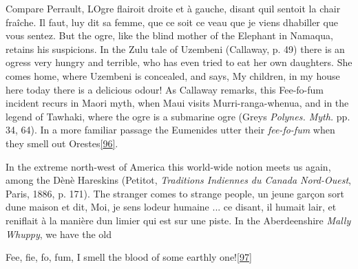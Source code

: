 \documentclass[14pt,a4paper]{memoir}
\begin{document}
Compare Perrault, \textquotesingle L\textquotesingle Ogre flairoit
droite et à gauche, disant qu\textquotesingle il sentoit la chair
fraîche. Il faut, luy dit sa femme, que ce soit ce veau que je viens
d\textquotesingle habiller que vous sentez.\textquotesingle{} But the
ogre, like the blind mother of the Elephant in Namaqua, retains his
suspicions. In the Zulu tale of Uzembeni (Callaway, p. 49) there is an
ogress very hungry and terrible, who has even tried to eat her own
daughters. She comes home, where Uzembeni is concealed, and says,
\textquotesingle My children, in my house here today there is a
delicious odour!\textquotesingle{} As Callaway remarks, this
\textquotesingle Fee-fo-fum\textquotesingle{} incident recurs in Maori
myth, when Maui visits Murri-ranga-whenua, and in the legend of Tawhaki,
where the ogre is a submarine ogre (Grey\textquotesingle s
\emph{Polynes. Myth.} pp. 34, 64). In a more familiar passage the
Eumenides utter their \emph{fee-fo-fum} when they smell out
Orestes\protect\hypertarget{4533318093929944247_33931-h-1.htm.xhtmlux5cux23FNanchor_96}{}{}\protect\hyperlink{4533318093929944247_33931-h-1.htm.xhtmlux5cux23Footnote_96}{{[}96{]}}.

In the extreme north-west of America this world-wide notion meets us
again, among the Dènè Hareskins (Petitot, \emph{Traditions Indiennes du
Canada Nord-Ouest}, Paris, 1886, p. 171). The stranger comes to strange
people, \textquotesingle un jeune garçon sort d\textquotesingle une
maison et dit, Moi, je sens l\textquotesingle odeur humaine ... ce
disant, il humait l\textquotesingle air, et reniflait à la manière
d\textquotesingle un limier qui est sur une piste.\textquotesingle{} In
the Aberdeenshire \emph{Mally Whuppy}, we have the old

{Fee, fie, fo, fum,} {I smell the blood of some earthly
one!\protect\hypertarget{4533318093929944247_33931-h-1.htm.xhtmlux5cux23FNanchor_97}{}{}\protect\hyperlink{4533318093929944247_33931-h-1.htm.xhtmlux5cux23Footnote_97}{{[}97{]}}}
\end{document}
